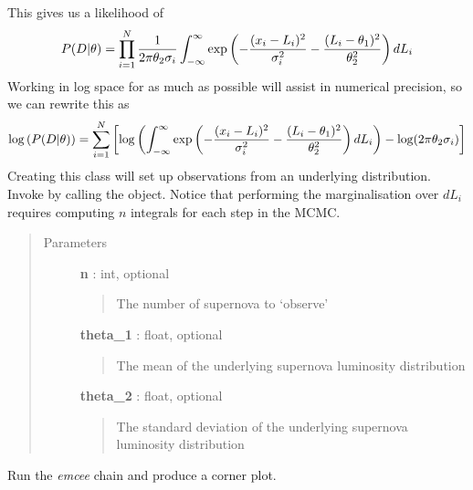 \documentclass[letterpaper,10pt,english]{sphinxmanual}
\begin{document}
\begin{fulllineitems}
This gives us a likelihood of
\begin{gather}
\begin{split}P(D|\theta) = \prod_{i=1}^N  \frac{1}{2\pi \theta_2 \sigma_i}  \int_{-\infty}^\infty
\exp\left(-\frac{(x_i-L_i)^2}{\sigma_i^2} -\frac{(L_i-\theta_1)^2}{\theta_2^2} \right) dL_i\end{split}\notag
\end{gather}
Working in log space for as much as possible will assist in numerical precision, so we can rewrite this as
\begin{gather}
\begin{split}\log\left(P(D|\theta)\right) =  \sum_{i=1}^N  \left[
        \log\left( \int_{-\infty}^\infty \exp\left(-\frac{(x_i-L_i)^2}{\sigma_i^2} -
\frac{(L_i-\theta_1)^2}{\theta_2^2} \right) dL_i \right) -\log(2\pi\theta_2\sigma_i) \right]\end{split}\notag
\end{gather}
Creating this class will set up observations from an underlying distribution.
Invoke  by calling the object. Notice that performing the marginalisation over
\(dL_i\) requires computing \(n\) integrals for each step in the MCMC.
\begin{quote}\begin{description}
\item[{Parameters}] \leavevmode
\textbf{n} : int, optional
\begin{quote}

The number of supernova to `observe'
\end{quote}

\textbf{theta\_1} : float, optional
\begin{quote}

The mean of the underlying supernova luminosity distribution
\end{quote}

\textbf{theta\_2} : float, optional
\begin{quote}

The standard deviation of the underlying supernova luminosity distribution
\end{quote}

\end{description}\end{quote}

\begin{fulllineitems}
\label{dessn.simple:dessn.simple.exampleIntegral.ExampleIntegral.do_emcee}
Run the \emph{emcee} chain and produce a corner plot.


\end{fulllineitems}
\end{fulllineitems}
\end{document}
